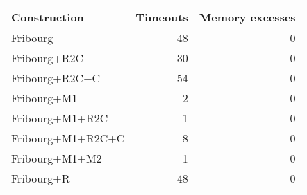 \begin{tabular}{lrr}
  \hline
Construction & Timeouts & Memory excesses \\ 
  \hline
Fribourg & 48 & 0 \\ 
  Fribourg+R2C & 30 & 0 \\ 
  Fribourg+R2C+C & 54 & 0 \\ 
  Fribourg+M1 & 2 & 0 \\ 
  Fribourg+M1+R2C & 1 & 0 \\ 
  Fribourg+M1+R2C+C & 8 & 0 \\ 
  Fribourg+M1+M2 & 1 & 0 \\ 
  Fribourg+R & 48 & 0 \\ 
   \hline
\end{tabular}
